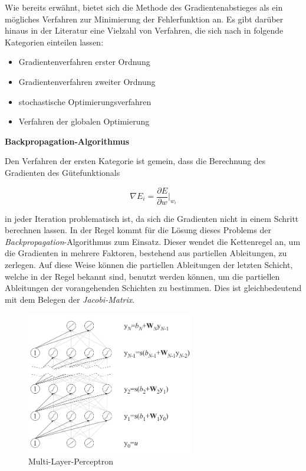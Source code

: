 Wie bereits erwähnt, bietet sich die Methode des Gradientenabstieges als ein mögliches Verfahren zur Minimierung der Fehlerfunktion an. Es gibt darüber hinaus in der Literatur eine Vielzahl von Verfahren, die sich nach \cite{Sklyarenko.2002} in folgende Kategorien einteilen lassen:

\begin{itemize}
	\item Gradientenverfahren erster Ordnung
	\item Gradientenverfahren zweiter Ordnung
	\item stochastische Optimierungsverfahren
	\item Verfahren der globalen Optimierung
\end{itemize}


\textbf{Backpropagation-Algorithmus}

Den Verfahren der ersten Kategorie ist gemein, dass die Berechnung des Gradienten des Gütefunktionals

\begin{equation}
\nabla E_i = \dfrac{\partial E}{\partial w}\bigg|_{w_i}
\end{equation}

in jeder Iteration problematisch ist, da sich die Gradienten nicht in einem Schritt berechnen lassen. In der Regel kommt für die Lösung dieses Problems der \textit{Backpropagation}-Algorithmus zum Einsatz. Dieser wendet die Kettenregel an, um die Gradienten in mehrere Faktoren, bestehend aus partiellen Ableitungen, zu zerlegen. Auf diese Weise können die partiellen Ableitungen der letzten Schicht, welche in der Regel bekannt sind, benutzt werden können, um die partiellen Ableitungen der vorangehenden Schichten zu bestimmen. Dies ist gleichbedeutend mit dem Belegen der \textit{Jacobi-Matrix}. \\


\begin{figure} 
	\centering
	\includegraphics[width=0.65\textwidth]{images/backpropagation2}
	\caption{Multi-Layer-Perceptron \cite{Sturm.2000}}
	\label{fig:backpropagation}
\end{figure}

